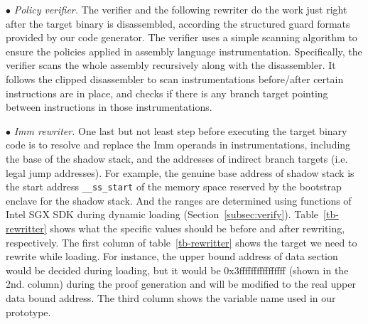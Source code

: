 \vspace{2pt}\noindent$\bullet$\textit{ Policy verifier.}\label{subsec-policyverifer}
The verifier and the following rewriter do the work just right after the target binary is disassembled, according the structured guard formats provided by our code generator. The verifier uses a simple scanning algorithm to ensure the policies applied in assembly language instrumentation. 
Specifically, the verifier scans the whole assembly recursively along with the disassembler. It follows the clipped disassembler to scan instrumentations before/after certain instructions are in place, and checks if there is any branch target pointing between instructions in those instrumentations.

\vspace{2pt}\noindent$\bullet$\textit{ Imm rewriter.}\label{subsec:immrewriter} One last but not least step before executing the target binary code is to resolve and replace the Imm operands in instrumentations, including the base of the shadow stack, and the addresses of indirect branch targets (i.e. legal jump addresses). For example, the genuine base address of shadow stack is the start address \verb|__ss_start| of the memory space reserved by the bootstrap enclave for the shadow stack. And the ranges are determined using functions of Intel SGX SDK during dynamic loading (Section~\ref{subsec:verify}).
Table~\ref{tb-rewritter} shows what the specific values should be before and after rewriting, respectively. 
The first column of table~\ref{tb-rewritter} shows the target we need to rewrite while loading. For instance, the upper bound address of data section would be decided during loading, but it would be 0x3ffffffffffffffff (shown in the 2nd. column) during the proof generation and will be modified to the real upper data bound address. The third column shows the variable name used in our prototype.


